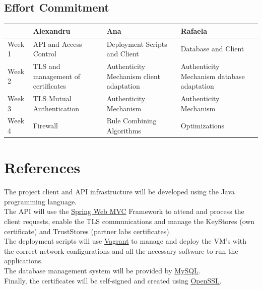 \subsection{Effort Commitment}

\begin{tabularx}{0.8\textwidth} { 
  | >{\centering\arraybackslash}X 
  | >{\centering\arraybackslash}X 
  | >{\centering\arraybackslash}X 
  | >{\centering\arraybackslash}X | }
 \hline
  & Alexandru & Ana  & Rafaela \\
 \hline
 Week 1  & API and Access Control  & Deployment Scripts and Client  & Database and Client \\
  \hline
  Week 2  & TLS and management of certificates  & Authenticity Mechanism client adaptation  & Authenticity Mechanism database adaptation \\
   \hline
   Week 3  & TLS Mutual Authentication  & Authenticity Mechanism  & Authenticity Mechanism \\
    \hline
    Week 4  & Firewall  & Rule Combining Algorithms  & Optimizations \\
\hline
\end{tabularx}

\section{References}

The project client and API infrastructure will be developed using the Java programming language. \\

The API will use the \href{https://docs.spring.io/spring-framework/docs/3.2.x/spring-framework-reference/html/mvc.html}{Spring Web MVC} Framework to attend and process the client requests, enable the TLS communications and manage the KeyStores (own certificate) and TrustStores (partner labs certificates). \\

The deployment scripts will use \href{https://www.vagrantup.com/}{Vagrant} to manage and deploy the VM's with the correct network configurations and all the necessary software to run the applications. \\

The database management system will be provided by \href{https://www.mysql.com/}{MySQL}. \\

Finally, the certificates will be self-signed and created using \href{https://www.openssl.org/}{OpenSSL}.
